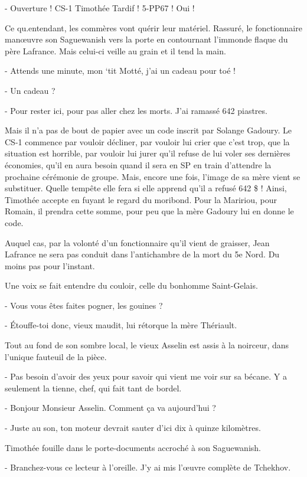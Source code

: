 - Ouverture ! CS-1 Timothée Tardif ! 5-PP67 ! Oui !

Ce qu.entendant, les commères vont quérir leur matériel. Rassuré, le fonctionnaire manœuvre son Saguewanish vers la porte en contournant l’immonde flaque du père Lafrance. Mais celui-ci veille au grain et il tend la main.

- Attends une minute, mon ‘tit Motté, j’ai un cadeau pour toé !

- Un cadeau ?

- Pour rester ici, pour pas aller chez les morts. J’ai ramassé 642 piastres.

Mais il n’a pas de bout de papier avec un code inscrit par Solange Gadoury. Le CS-1 commence par vouloir décliner, par vouloir lui crier que c’est trop, que la situation est horrible, par vouloir lui jurer qu’il refuse de lui voler ses dernières économies, qu’il en aura besoin quand il sera en SP en train d’attendre la prochaine cérémonie de groupe. Mais, encore une fois, l’image de sa mère vient se substituer. Quelle tempête elle fera si elle apprend qu’il a refusé 642 \$ ! Ainsi, Timothée accepte en fuyant le regard du moribond. Pour la Maririou, pour Romain, il prendra cette somme, pour peu que la mère Gadoury lui en donne le code.

Auquel cas, par la volonté d’un fonctionnaire qu’il vient de graisser, Jean Lafrance ne sera pas conduit dans l’antichambre de la mort du 5e Nord. Du moins pas pour l’instant.

Une voix se fait entendre du couloir, celle du bonhomme Saint-Gelais.

- Vous vous êtes faites pogner, les gouines ?

- Étouffe-toi donc, vieux maudit, lui rétorque la mère Thériault.

Tout au fond de son sombre local, le vieux Asselin est assis à la noirceur, dans l’unique fauteuil de la pièce.

- Pas besoin d’avoir des yeux pour savoir qui vient me voir sur sa bécane. Y a seulement la tienne, chef, qui fait tant de bordel.

- Bonjour Monsieur Asselin. Comment ça va aujourd’hui ?

- Juste au son, ton moteur devrait sauter d’ici dix à quinze kilomètres.

Timothée fouille dans le porte-documents accroché à son Saguewanish.

- Branchez-vous ce lecteur à l’oreille. J’y ai mis l’œuvre complète de Tchekhov.

